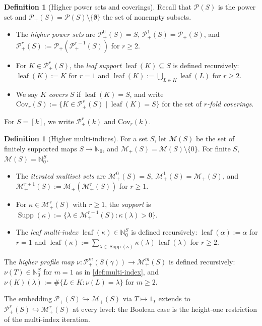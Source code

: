 \documentclass[10pt,a4paper]{article}
\theoremstyle{plain}
\theoremstyle{definition}
\newtheorem{definition}[theorem]{Definition}
\newcommand{\IN}{\mathbb{N}} %
\newcommand{\1}{\mathbb{1}} %
\newcommand{\set}[1]{\{#1\}} %
\newcommand{\KP}{\mathcal{P}}
\newcommand{\tightlist}{\setlength{\itemsep}{0pt}\setlength{\parskip}{0pt}}
\newcommand{\KM}{\mathcal{M}} %
\newcommand{\Cov}{\mathrm{Cov}} %
\DeclareMathOperator{\lf}{\mathrm{leaf}} %
\DeclareMathOperator{\supp}{\mathrm{Supp}} %
\begin{document}
\begin{definition}[Higher power sets and coverings]

\label{def:coverings} Recall that \(\KP(S)\) is the power set and
\(\KP_+(S) = \KP(S) \setminus \set{\emptyset}\) the set of nonempty
subsets.

\begin{itemize}
\tightlist
\item
  The \emph{higher power sets} are \(\KP_+^0(S) = S\),
  \(\KP_+^1(S) = \KP_+(S)\), and \(\KP_+^r(S) := \KP_+(\KP_+^{r-1}(S))\)
  for \(r \geq 2\).
\item
  For \(K \in \KP_+^r(S)\), the \emph{leaf support}
  \(\lf(K) \subseteq S\) is defined recursively: \(\lf(K) := K\) for
  \(r = 1\) and \(\lf(K) := \bigcup_{L \in K} \lf(L)\) for \(r \geq 2\).
\item
  We say \(K\) \emph{covers} \(S\) if \(\lf(K) = S\), and write
  \(\Cov_r(S) := \set{K \in \KP_+^r(S) \mid \lf(K) = S}\) for the set of
  \emph{\(r\)-fold coverings}.
\end{itemize}

For \(S = [k]\), we write \(\KP_+^r(k)\) and \(\Cov_r(k)\).

\end{definition}

\begin{definition}[Higher multi-indices]

\label{def:higher-multi-indices} For a set \(S\), let \(\KM(S)\) be the
set of finitely supported maps \(S \to \IN_0\), and
\(\KM_+(S) = \KM(S) \setminus \set{0}\). For finite \(S\),
\(\KM(S) = \IN_0^S\).

\begin{itemize}
\tightlist
\item
  The \emph{iterated multiset sets} are \(\KM_+^0(S) = S\),
  \(\KM_+^1(S) = \KM_+(S)\), and \(\KM_+^{r+1}(S) := \KM_+(\KM_+^r(S))\)
  for \(r \geq 1\).
\item
  For \(\kappa \in \KM_+^r(S)\) with \(r \geq 1\), the \emph{support} is
  \(\supp(\kappa) := \set{\lambda \in \KM_+^{r-1}(S) : \kappa(\lambda) > 0}\).
\item
  The \emph{leaf multi-index} \(\lf(\kappa) \in \IN_0^S\) is defined
  recursively: \(\lf(\alpha) := \alpha\) for \(r = 1\) and
  \(\lf(\kappa) := \sum_{\lambda \in \supp(\kappa)} \kappa(\lambda)\, \lf(\lambda)\)
  for \(r \geq 2\).
\end{itemize}

The \emph{higher profile map} \(\nu: \KP_+^m(S(\gamma)) \to \KM_+^m(S)\)
is defined recursively: \(\nu(T) \in \IN_0^S\) for \(m = 1\) as in
\ref{def:multi-index}, and
\(\nu(K)(\lambda) := \#\set{L \in K : \nu(L) = \lambda}\) for
\(m \geq 2\).

The embedding \(\KP_+(S) \hookrightarrow \KM_+(S)\) via
\(T \mapsto 1_T\) extends to \(\KP_+^r(S) \hookrightarrow \KM_+^r(S)\)
at every level: the Boolean case is the height-one restriction of the
multi-index iteration.

\end{definition}
\end{document}
